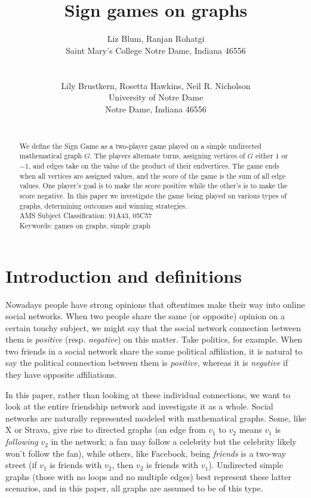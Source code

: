 \documentclass[amsart,11pt]{article}
\title{Sign games on graphs}
\author{Liz Blum, Ranjan Rohatgi\\
    Saint Mary's College
    Notre Dame, Indiana  46556\\
    \\
    \\
    Lily Brustkern, Rosetta Hawkins, Neil R. Nicholson\\
    University of Notre Dame\\
    Notre Dame, Indiana  46556 \\
    \\
	}
\theoremstyle{dotless}
\theoremstyle{dotless}
\begin{document}
\maketitle

\begin{abstract}
We define the Sign Game as a two-player game played on a simple undirected mathematical graph $G$. The players alternate turns, assigning vertices of $G$ either $1$ or $-1$, and edges take on the value of the product of their endvertices. The game ends when all vertices are assigned values, and the score of the game is the sum of all edge values. One player's goal is to make the score positive while the other's is to make the score negative. In this paper we investigate the game being played on various types of graphs, determining outcomes and winning strategies. \\

\noindent AMS Subject Classification: 91A43, 05C57\\

\noindent Keywords: games on graphs, simple graph
\end{abstract}

\section{Introduction and definitions}

Nowadays people have strong opinions that oftentimes make their way into online social networks. When two people share the same (or opposite) opinion on a certain touchy subject, we might say that the social network connection between them is \textit{positive} (resp. \textit{negative}) on this matter. Take politics, for example. When two friends in a social network share the same political affiliation, it is natural to say the political connection between them is \textit{positive}, whereas it is \textit{negative} if they have opposite affiliations. 

In this paper, rather than looking at these individual connections, we want to look at the entire friendship network and investigate it as a whole. Social networks are naturally represented modeled with mathematical graphs. Some, like X or Strava, give rise to directed graphs (an edge from $v_1$ to $v_2$ means $v_1$ is \textit{following} $v_2$ in the network; a fan may follow a celebrity but the celebrity likely won't follow the fan), while others, like Facebook, being \textit{friends} is a two-way street (if $v_1$ is friends with $v_2$, then $v_2$ is friends with $v_1$). Undirected simple graphs (those with no loops and no multiple edges) best represent these latter scenarios, and in this paper, all graphs are assumed to be of this type.
\end{document}
